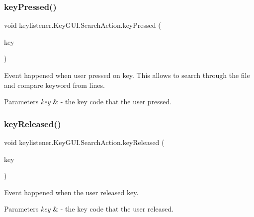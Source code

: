 \subsubsection{\texorpdfstring{key\+Pressed()}{keyPressed()}}
{\footnotesize\ttfamily void keylistener.\+Key\+G\+U\+I.\+Search\+Action.\+key\+Pressed (\begin{DoxyParamCaption}\item[{Key\+Event}]{key }\end{DoxyParamCaption})\hspace{0.3cm}{\ttfamily [inline]}}

Event happened when user pressed on key. This allows to search through the file and compare keyword from lines. 
\begin{DoxyParams}{Parameters}
{\em key} & -\/ the key code that the user pressed. \\
\hline
\end{DoxyParams}
\mbox{\label{classkeylistener_1_1_key_g_u_i_1_1_search_action_a366fb562665be4c9e0c56402e56d5d67}} 
\subsubsection{\texorpdfstring{key\+Released()}{keyReleased()}}
{\footnotesize\ttfamily void keylistener.\+Key\+G\+U\+I.\+Search\+Action.\+key\+Released (\begin{DoxyParamCaption}\item[{Key\+Event}]{key }\end{DoxyParamCaption})\hspace{0.3cm}{\ttfamily [inline]}}

Event happened when the user released key. 
\begin{DoxyParams}{Parameters}
{\em key} & -\/ the key code that the user released. \\
\hline
\end{DoxyParams}
\mbox{\label{classkeylistener_1_1_key_g_u_i_1_1_search_action_a0539df25ca413569d89231b475ed46bd}} 

